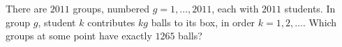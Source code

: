 There are $2011$ groups, numbered $g=1,\ldots,2011$, each with $2011$ students. In group $g$, student $k$ contributes $kg$ balls to its box, in order $k=1,2,\ldots$. Which groups at some point have exactly $1265$ balls?
